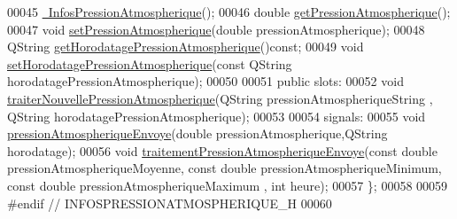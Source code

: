 \begin{DoxyCode}
00045         \hyperlink{class_infos_pression_atmospherique_a3f4d667523391ceb3c2342c70a3ee41f}{~InfosPressionAtmospherique}();
00046         \textcolor{keywordtype}{double} \hyperlink{class_infos_pression_atmospherique_ace9906ecdd245d4d443554fcc77c76a5}{getPressionAtmospherique}();
00047         \textcolor{keywordtype}{void} \hyperlink{class_infos_pression_atmospherique_ab598771e222fbca604ac6dba5d2aacb9}{setPressionAtmospherique}(\textcolor{keywordtype}{double} pressionAtmospherique);
00048         QString \hyperlink{class_infos_pression_atmospherique_a6836dfc16f1be4287354ea26a080b436}{getHorodatagePressionAtmospherique}()\textcolor{keyword}{const};
00049         \textcolor{keywordtype}{void} \hyperlink{class_infos_pression_atmospherique_a5d8ba94db66bb7bcdf5a70dd6f21de23}{setHorodatagePressionAtmospherique}(\textcolor{keyword}{const} QString 
      horodatagePressionAtmospherique);
00050 
00051     \textcolor{keyword}{public} slots:
00052         \textcolor{keywordtype}{void} \hyperlink{class_infos_pression_atmospherique_ab280f47f2a1376222a45fde8638489d2}{traiterNouvellePressionAtmospherique}(QString 
      pressionAtmospheriqueString , QString horodatagePressionAtmospherique);
00053 
00054     signals:
00055         \textcolor{keywordtype}{void} \hyperlink{class_infos_pression_atmospherique_ad5342b25c87fd5e41a89ad74b5f69c86}{pressionAtmospheriqueEnvoye}(\textcolor{keywordtype}{double} pressionAtmospherique,QString 
      horodatage);
00056         \textcolor{keywordtype}{void} \hyperlink{class_infos_pression_atmospherique_af759842c05a1e59b56d433e823bee341}{traitementPressionAtmospheriqueEnvoye}(\textcolor{keyword}{const} \textcolor{keywordtype}{double} 
      pressionAtmospheriqueMoyenne, \textcolor{keyword}{const} \textcolor{keywordtype}{double} pressionAtmospheriqueMinimum, \textcolor{keyword}{const} \textcolor{keywordtype}{double} pressionAtmospheriqueMaximum
      , \textcolor{keywordtype}{int} heure);
00057 \};
00058 
00059 \textcolor{preprocessor}{#endif // INFOSPRESSIONATMOSPHERIQUE\_H}
00060 
\end{DoxyCode}

